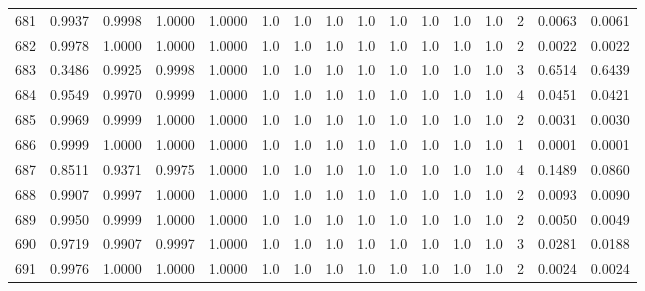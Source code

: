 \begin{tabular}{lrrrrrrrrrrrrrrr}
681 &      0.9937 &  0.9998 &  1.0000 &  1.0000 &     1.0 &     1.0 &     1.0 &     1.0 &     1.0 &     1.0 &      1.0 &        1.0 &      2 &                    0.0063 &                     0.0061 \\
682 &      0.9978 &  1.0000 &  1.0000 &  1.0000 &     1.0 &     1.0 &     1.0 &     1.0 &     1.0 &     1.0 &      1.0 &        1.0 &      2 &                    0.0022 &                     0.0022 \\
683 &      0.3486 &  0.9925 &  0.9998 &  1.0000 &     1.0 &     1.0 &     1.0 &     1.0 &     1.0 &     1.0 &      1.0 &        1.0 &      3 &                    0.6514 &                     0.6439 \\
684 &      0.9549 &  0.9970 &  0.9999 &  1.0000 &     1.0 &     1.0 &     1.0 &     1.0 &     1.0 &     1.0 &      1.0 &        1.0 &      4 &                    0.0451 &                     0.0421 \\
685 &      0.9969 &  0.9999 &  1.0000 &  1.0000 &     1.0 &     1.0 &     1.0 &     1.0 &     1.0 &     1.0 &      1.0 &        1.0 &      2 &                    0.0031 &                     0.0030 \\
686 &      0.9999 &  1.0000 &  1.0000 &  1.0000 &     1.0 &     1.0 &     1.0 &     1.0 &     1.0 &     1.0 &      1.0 &        1.0 &      1 &                    0.0001 &                     0.0001 \\
687 &      0.8511 &  0.9371 &  0.9975 &  1.0000 &     1.0 &     1.0 &     1.0 &     1.0 &     1.0 &     1.0 &      1.0 &        1.0 &      4 &                    0.1489 &                     0.0860 \\
688 &      0.9907 &  0.9997 &  1.0000 &  1.0000 &     1.0 &     1.0 &     1.0 &     1.0 &     1.0 &     1.0 &      1.0 &        1.0 &      2 &                    0.0093 &                     0.0090 \\
689 &      0.9950 &  0.9999 &  1.0000 &  1.0000 &     1.0 &     1.0 &     1.0 &     1.0 &     1.0 &     1.0 &      1.0 &        1.0 &      2 &                    0.0050 &                     0.0049 \\
690 &      0.9719 &  0.9907 &  0.9997 &  1.0000 &     1.0 &     1.0 &     1.0 &     1.0 &     1.0 &     1.0 &      1.0 &        1.0 &      3 &                    0.0281 &                     0.0188 \\
691 &      0.9976 &  1.0000 &  1.0000 &  1.0000 &     1.0 &     1.0 &     1.0 &     1.0 &     1.0 &     1.0 &      1.0 &        1.0 &      2 &                    0.0024 &                     0.0024 \\

\end{tabular}
